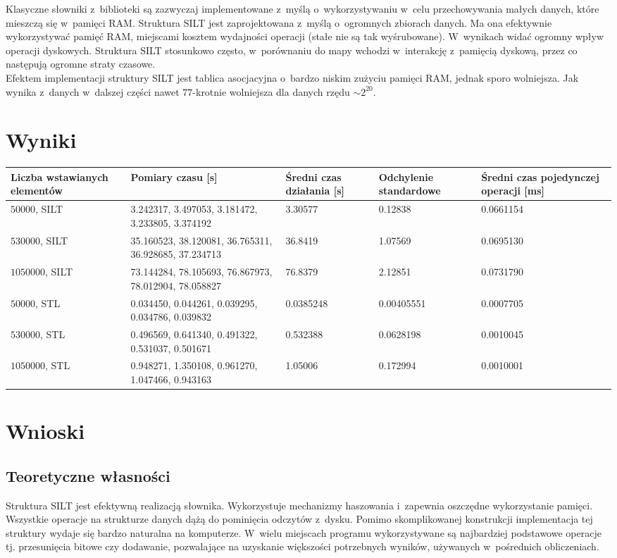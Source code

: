 \documentclass[declaration,shortabstract,masc]{iithesis}
\begin{document}
			\indent Klasyczne słowniki z~biblioteki są zazwyczaj implementowane z~myślą o~wykorzystywaniu w~celu przechowywania małych danych, które mieszczą się w~pamięci RAM. Struktura SILT jest zaprojektowana z~myślą o~ogromnych zbiorach danych. Ma ona efektywnie wykorzystywać pamięć RAM, miejscami kosztem wydajności operacji (stałe nie są tak wyśrubowane). W~wynikach widać ogromny wpływ operacji dyskowych. Struktura SILT stosunkowo często, w~porównaniu do mapy wchodzi w~interakcję z~pamięcią dyskową, przez co następują ogromne straty czasowe.\\
			Efektem implementacji struktury SILT jest tablica asocjacyjna o~bardzo niskim zużyciu pamięci RAM, jednak sporo wolniejsza. Jak wynika z~danych w~dalszej części nawet $77$-krotnie wolniejsza dla danych rzędu $\sim2^{20}$.
		\section{Wyniki}
			\begin{tabular}{|p{62pt}|p{62pt}|p{62pt}|p{62pt}|p{62pt}|}
				\hline
				Liczba wstawianych elementów & Pomiary czasu [s] & Średni czas działania [s] & Odchylenie standardowe & Średni czas pojedynczej operacji [ms]\\
				\hline
				$50000$, SILT & 3.242317, 3.497053, 3.181472, 3.233805, 3.374192 & 3.30577 & 0.12838 & 0.0661154\\
				\hline
				$530000$, SILT & 35.160523, 38.120081, 36.765311, 36.928685, 37.234713 & 36.8419 & 1.07569 & 0.0695130\\
				\hline
				$1050000$, SILT & 73.144284, 78.105693, 76.867973, 78.012904, 78.058827 & 76.8379 & 2.12851 & 0.0731790\\
				\hline
				$50000$, STL & 0.034450, 0.044261, 0.039295, 0.034786, 0.039832 & 0.0385248 & 0.00405551 & 0.0007705\\
				\hline
				$530000$, STL & 0.496569, 0.641340, 0.491322, 0.531037, 0.501671 & 0.532388 & 0.0628198 & 0.0010045\\
				\hline
				$1050000$, STL & 0.948271, 1.350108, 0.961270, 1.047466, 0.943163 & 1.05006 & 0.172994 & 0.0010001\\
				\hline
			\end{tabular}
		\section{Wnioski}
			\subsection{Teoretyczne własności}
				Struktura SILT jest efektywną realizacją słownika. Wykorzystuje mechanizmy haszowania i~zapewnia oszczędne wykorzystanie pamięci. Wszystkie operacje na strukturze danych dążą do pominięcia odczytów z~dysku. Pomimo skomplikowanej konstrukcji implementacja tej struktury wydaje się bardzo naturalna na komputerze. W~wielu miejscach programu wykorzystywane są najbardziej podstawowe operacje tj. przesunięcia bitowe czy dodawanie, pozwalające na uzyskanie większości potrzebnych wyników, używanych w~pośrednich obliczeniach.
\end{document}
